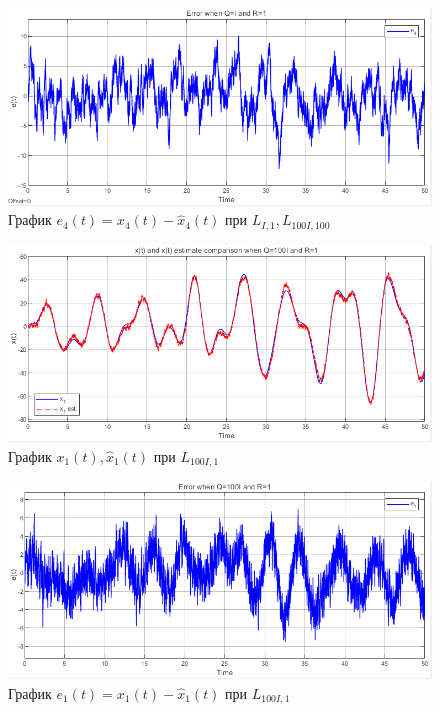 \documentclass[a4paper, 12pt]{article}
\begin{document}
    \begin{figure}[H]
        \centering
        \includegraphics[scale=0.75]{2task_e4.png}
        \captionsetup{skip=0pt}
        \caption{График $e_4(t)=x_4(t)-\hat{x}_4(t)$ при $L_{I,1},L_{100I,100}$}
        \label{fig:2task_e4}
    \end{figure}
    \begin{figure}[H]
        \centering
        \includegraphics[scale=0.75]{2task_xx1.png}
        \captionsetup{skip=0pt}
        \caption{График $x_1(t),\hat{x}_1(t)$ при $L_{100I,1}$}
        \label{fig:2task_xx1}
    \end{figure}
    \begin{figure}[H]
        \centering
        \includegraphics[scale=0.75]{2task_ee1.png}
        \captionsetup{skip=0pt}
        \caption{График $e_1(t)=x_1(t)-\hat{x}_1(t)$ при $L_{100I,1}$}
        \label{fig:2task_ee1}
    \end{figure}
\end{document}
